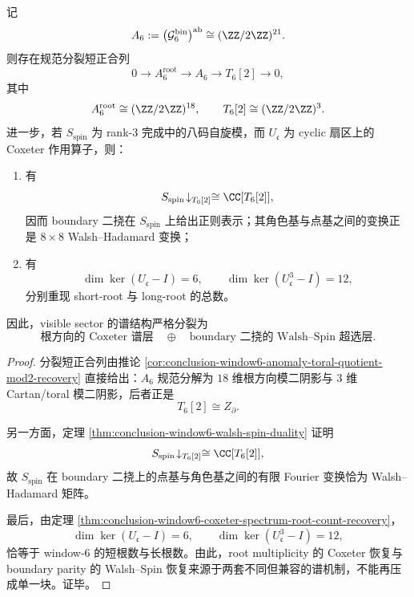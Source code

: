 \begin{theorem}\label{thm:conclusion-window6-walsh-spin-root-torsion-stratification}
记
\[
A_6:=\bigl(\mathcal G_6^{\mathrm{bin}}\bigr)^{\mathrm{ab}}\cong (\ZZ/2\ZZ)^{21}.
\]
则存在规范分裂短正合列
\[
0\longrightarrow A_6^{\mathrm{root}}
\longrightarrow A_6
\longrightarrow T_6[2]
\longrightarrow 0,
\]
其中
\[
A_6^{\mathrm{root}}\cong (\ZZ/2\ZZ)^{18},
\qquad
T_6[2]\cong (\ZZ/2\ZZ)^3.
\]
进一步，若 \(S_{\mathrm{spin}}\) 为 rank-\(3\) 完成中的八码自旋模，而 \(U_{\mathfrak c}\) 为 cyclic 扇区上的 Coxeter 作用算子，则：
\begin{enumerate}
  \item 有
  \[
  S_{\mathrm{spin}}\!\downarrow_{T_6[2]}
  \cong
  \CC[T_6[2]],
  \]
  因而 boundary 二挠在 \(S_{\mathrm{spin}}\) 上给出正则表示；其角色基与点基之间的变换正是 \(8\times 8\) Walsh--Hadamard 变换；
  \item 有
  \[
  \dim\ker(U_{\mathfrak c}-I)=6,
  \qquad
  \dim\ker(U_{\mathfrak c}^3-I)=12,
  \]
  分别重现 short-root 与 long-root 的总数。
\end{enumerate}
因此，visible sector 的谱结构严格分裂为
\[
\text{根方向的 Coxeter 谱层}
\quad\oplus\quad
\text{boundary 二挠的 Walsh--Spin 超选层}.
\]
\end{theorem}
\begin{proof}
分裂短正合列由推论 \ref{cor:conclusion-window6-anomaly-toral-quotient-mod2-recovery} 直接给出：\(A_6\) 规范分解为 \(18\) 维根方向模二阴影与 \(3\) 维 Cartan/toral 模二阴影，后者正是
\[
T_6[2]\cong Z_{\partial}.
\]

另一方面，定理 \ref{thm:conclusion-window6-walsh-spin-duality} 证明
\[
S_{\mathrm{spin}}\!\downarrow_{T_6[2]}
\cong
\CC[T_6[2]],
\]
故 \(S_{\mathrm{spin}}\) 在 boundary 二挠上的点基与角色基之间的有限 Fourier 变换恰为 Walsh--Hadamard 矩阵。

最后，由定理 \ref{thm:conclusion-window6-coxeter-spectrum-root-count-recovery}，
\[
\dim\ker(U_{\mathfrak c}-I)=6,
\qquad
\dim\ker(U_{\mathfrak c}^3-I)=12,
\]
恰等于 window-\(6\) 的短根数与长根数。由此，root multiplicity 的 Coxeter 恢复与 boundary parity 的 Walsh--Spin 恢复来源于两套不同但兼容的谱机制，不能再压成单一块。证毕。
\end{proof}

